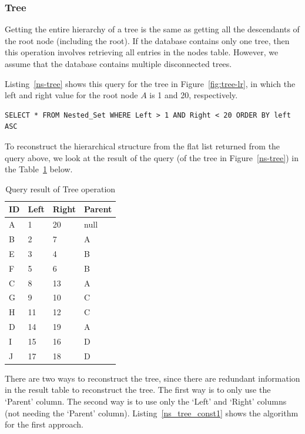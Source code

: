 \subsubsection{Tree}

Getting the entire hierarchy of a tree is the same as getting all the descendants of the root node (including the root). If the database contains only one tree, then this operation involves retrieving all entries in the nodes table. However, we assume that the database contains multiple disconnected trees.

Listing~\ref{ns-tree} shows this query for the tree in Figure~\ref{fig:tree-lr}, in which the left and right value for the root node $A$ is 1 and 20, respectively.

\begin{minipage}{\linewidth}
\begin{lstlisting}[frame=single]
SELECT * FROM Nested_Set WHERE Left > 1 AND Right < 20 ORDER BY left ASC
\end{lstlisting}	
\end{minipage}

To reconstruct the hierarchical structure from the flat list returned from the query above, we look at the result of the query (of the tree in Figure~\ref{ns-tree}) in the Table~\ref{table:ns_tree} below.

\begin{table}[h]
\centering
\begin{tabular}{|l|l|l|l|}
\hline
{\bf ID} & {\bf Left} & {\bf Right} & {\bf Parent} \\ \hline\hline
A & 1 & 20 & null \\ \hline
B & 2 & 7 & A \\ \hline
E & 3 & 4 & B \\ \hline
F & 5 & 6 & B \\ \hline
C & 8 & 13 & A \\ \hline
G & 9 & 10 & C \\ \hline
H & 11 & 12	& C \\ \hline
D & 14 & 19	& A \\ \hline
I & 15 & 16	& D \\ \hline
J & 17 & 18	& D \\ \hline
\end{tabular}
\caption{Query result of Tree operation\label{table:ns_tree}}
\end{table}

There are two ways to reconstruct the tree, since there are redundant information in the result table to reconstruct the tree. The first way is to only use the `Parent' column. The second way is to use only the `Left' and `Right' columns (not needing the `Parent' column). Listing~\ref{ns_tree_const1} shows the algorithm for the first approach.

